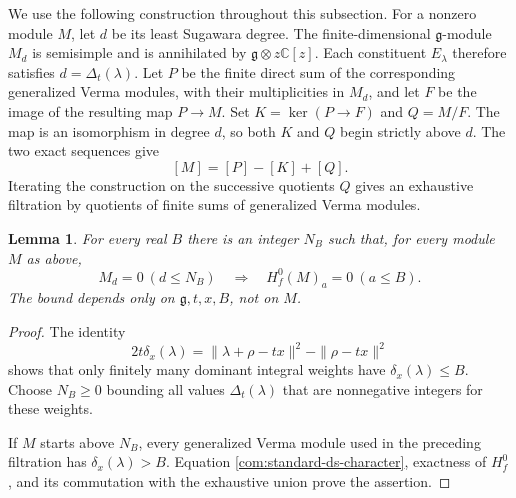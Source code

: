 \documentclass[11pt,a4paper]{amsart}
\numberwithin{equation}{section}
\newtheorem{lemma}[theorem]{Lemma}
\theoremstyle{definition}
\theoremstyle{remark}
\newcommand{\C}{\mathbb C}
\newcommand{\g}{\mathfrak g}
\begin{document}
We use the following construction throughout this subsection. For a
nonzero module $M$, let $d$ be its least Sugawara degree. The finite-dimensional $\g$-module $M_d$ is semisimple and is annihilated by $\g\otimes z\C[z]$.
Each constituent $E_\lambda$ therefore satisfies
$d=\Delta_t(\lambda)$. Let $P$ be the finite direct sum of the
corresponding generalized Verma modules, with their multiplicities in $M_d$, and let
$F$ be the image of the resulting map $P\to M$. Set
$K=\ker(P\to F)$ and $Q=M/F$. The map is an isomorphism in degree
$d$, so both $K$ and $Q$ begin strictly above $d$. The two exact
sequences give
\begin{equation}\label{com:degree-decomposition}
 [M]=[P]-[K]+[Q].
\end{equation}
Iterating the construction on the successive quotients $Q$ gives an
exhaustive filtration by quotients of finite sums of generalized Verma modules.


\begin{lemma}\label{com:tail}
For every real $B$ there is an integer $N_B$ such that, for every
module $M$ as above,
$$
 M_d=0\ (d\le N_B)\quad\Longrightarrow\quad
 H_f^0(M)_a=0\ (a\le B).
$$
The bound depends only on $\g,t,x,B$, not on $M$.
\end{lemma}
\begin{proof}
The identity
\begin{equation}\label{com:coercivity}
 2t\delta_x(\lambda)
 =\|\lambda+\rho-tx\|^2-\|\rho-tx\|^2
\end{equation}
shows that only finitely many dominant integral weights have
$\delta_x(\lambda)\le B$. Choose $N_B\ge0$ bounding all values
$\Delta_t(\lambda)$ that are nonnegative integers for these weights.

If $M$ starts above $N_B$, every generalized Verma module used in the preceding
filtration has $\delta_x(\lambda)>B$. Equation
\eqref{com:standard-ds-character}, exactness of $H_f^0$, and its
commutation with the exhaustive union prove the assertion.
\end{proof}
\end{document}

